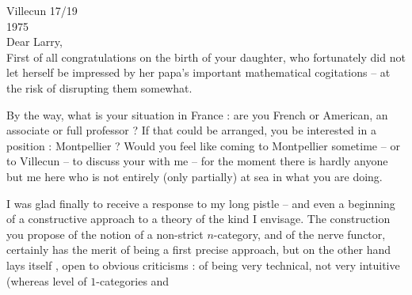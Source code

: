 \hfill Villecun 17/19 \\
\hfill 1975\\
Dear Larry,\\

First of all congratulations on the birth of your daughter, who fortunately did not let herself be impressed by her papa's important mathematical cogitations -- at the risk of disrupting them somewhat.

By the way, what is your situation in France : are you French or American, an associate or full professor ? If that could be arranged,  you be interested in a position : Montpellier ? Would you feel like coming to Montpellier sometime -- or to Villecun -- to discuss your  with me -- for the moment there is hardly anyone but me here who is not entirely (only partially) at sea in what you are doing.

I was glad finally to receive a response to my long pistle -- and even a beginning of a constructive approach to  a theory of the kind I envisage. The construction you propose of the notion of a non-strict $n$-category, and of the nerve functor, certainly has the merit  of being a first precise approach, but on the other hand lays itself  , open to obvious criticisms : of being very technical, not very intuitive (whereas  level of $1$-categories and
